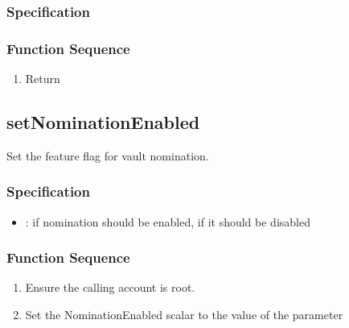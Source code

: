 \documentclass[a4paper,10pt,english]{sphinxmanual}
\begin{document}
\subsubsection{Specification}
\label{\detokenize{spec/nomination:specification}}



\subsubsection{Function Sequence}
\label{\detokenize{spec/nomination:function-sequence}}\begin{enumerate}
%
\item {} 
Return 

\end{enumerate}


\subsection{setNominationEnabled}
\label{\detokenize{spec/nomination:setnominationenabled}}\label{\detokenize{spec/nomination:id3}}
Set the feature flag for vault nomination.


\subsubsection{Specification}
\label{\detokenize{spec/nomination:id4}}


\begin{itemize}
\item {} 
:  if nomination should be enabled,  if it should be disabled

\end{itemize}


\subsubsection{Function Sequence}
\label{\detokenize{spec/nomination:id5}}\begin{enumerate}
%
\item {} 
Ensure the calling account is root.

\item {} 
Set the NominationEnabled scalar to the value of the  parameter

\end{enumerate}
\end{document}

